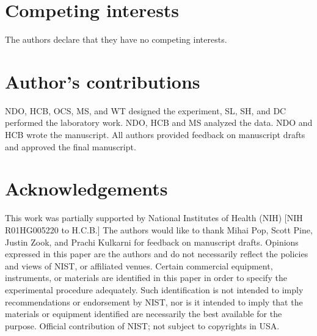 \documentclass{bmcart}
\begin{document}
\begin{backmatter}

\section*{Competing interests}
  The authors declare that they have no competing interests.

\section*{Author's contributions}
NDO, HCB, OCS, MS, and WT designed the experiment, SL, SH, and DC performed the laboratory work. NDO, HCB and MS analyzed the data. NDO and HCB wrote the manuscript. All authors provided feedback on manuscript drafts and approved the final manuscript. 

\section*{Acknowledgements}
This work was partially supported by National Institutes of Health (NIH) [NIH R01HG005220 to H.C.B.]
The authors would like to thank Mihai Pop, Scott Pine, Justin Zook, and Prachi Kulkarni for feedback on manuscript drafts. 
Opinions expressed in this paper are the authors and do not necessarily reflect the policies and views of NIST, or affiliated venues. Certain commercial equipment, instruments, or materials are identified in this paper in order to specify the experimental procedure adequately. Such identification is not intended to imply recommendations or endorsement by NIST, nor is it intended to imply that the materials or equipment identified are necessarily the best available for the purpose. Official contribution of NIST; not subject to copyrights in USA.




\end{backmatter}
\end{document}
